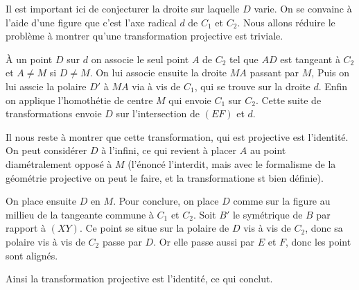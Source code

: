 \begin{sol}
Il est important ici de conjecturer la droite sur laquelle $D$ varie. On se convainc à l'aide d'une figure que c'est l'axe radical $d$ de $C_1$ et $C_2$. Nous allons réduire le problème à montrer qu'une transformation projective est triviale.

\medskip

À un point $D$ sur $d$ on associe le seul point $A$ de $C_2$ tel que $AD$ est tangeant à $C_2$ et $A\neq M$ si $D\neq M$. On lui associe ensuite la droite $MA$ passant par $M$, Puis on lui asscie la polaire $D'$ à $MA$ via à vis de $C_1$, qui se trouve sur la droite $d$. Enfin on applique l'homothétie de centre $M$ qui envoie $C_1$ sur $C_2$. Cette suite de transformations envoie $D$ sur l'intersection de $(EF)$ et $d$. 

\medskip

Il nous reste à montrer que cette transformation, qui est projective est l'identité. On peut considérer $D$ à l'infini, ce qui revient à placer $A$ au point diamétralement opposé à $M$ (l'énoncé l'interdit, mais avec le formalisme de la géométrie projective on peut le faire, et la transformatione st bien définie).

On place ensuite $D$ en $M$. Pour conclure, on place $D$ comme sur la figure au millieu de la tangeante commune à $C_1$ et $C_2$. Soit $B'$ le symétrique de $B$ par rapport à $(XY)$. Ce point se situe sur la polaire de $D$ vis à vis de $C_2$, donc sa polaire vis à vis de $C_2$ passe par $D$. Or elle passe aussi par $E$ et $F$, donc les point sont alignés.


\medskip

Ainsi la transformation projective est l'identité, ce qui conclut.

\end{sol}

%
